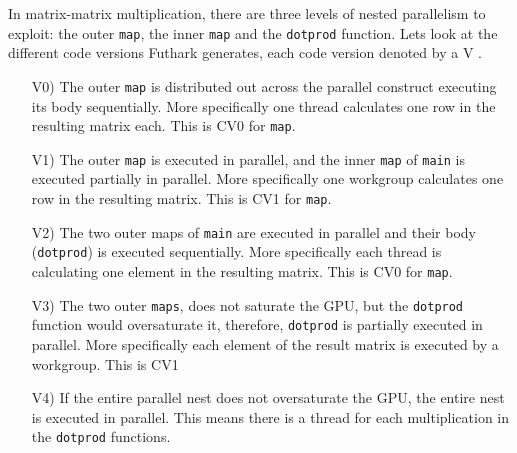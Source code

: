 \begin{center}
  \centering 
  \label{maptree}
\end{center}
In matrix-matrix multiplication, there are three levels of nested parallelism 
to exploit: the outer \texttt{map}, the inner \texttt{map} and the 
\texttt{dotprod} function. Lets look at the different code versions Futhark 
generates, each code version denoted by a V \cite{inc-flat}.
\begin{itemize}
  \item[V0)] The outer \texttt{map} is distributed out across the parallel 
  construct executing its body sequentially. More specifically one thread 
  calculates one row in the resulting matrix each. This is CV0 for 
  \texttt{map}.
  \item[V1)] The outer \texttt{map} is executed in parallel, and the inner 
  \texttt{map} of \texttt{main} is executed partially in parallel. More 
specifically one workgroup calculates one row in the resulting matrix. This is 
CV1 for \texttt{map}.
  \item[V2)] The two outer maps of \texttt{main} are executed in parallel and 
their body (\texttt{dotprod}) is executed sequentially. More specifically each 
thread is calculating one element in the resulting matrix. This is CV0 for 
\texttt{map}.
  \item[V3)] The two outer \texttt{maps}, does not saturate the GPU, but the 
  \texttt{dotprod} function would oversaturate it, therefore, \texttt{dotprod} 
  is partially executed in parallel. More specifically each element of the 
  result matrix is executed by a workgroup. This is CV1
  \item[V4)] If the entire parallel nest does not oversaturate the GPU, the 
entire nest is executed in parallel. This means there is a thread for each 
multiplication in the \texttt{dotprod} functions.
\end{itemize}

